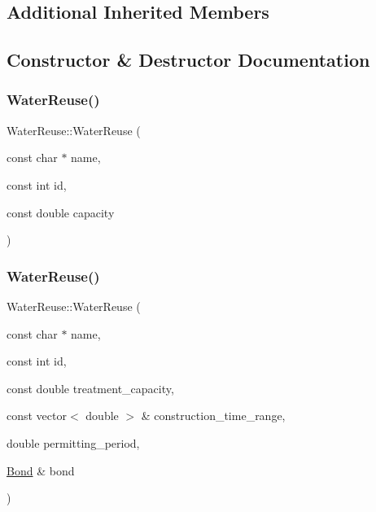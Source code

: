 \subsection*{Additional Inherited Members}


\subsection{Constructor \& Destructor Documentation}
\mbox{\label{classWaterReuse_a0493da65856f50fad2bc2d2c087f378f}} 
\subsubsection{\texorpdfstring{Water\+Reuse()}{WaterReuse()}\hspace{0.1cm}{\footnotesize\ttfamily [1/3]}}
{\footnotesize\ttfamily Water\+Reuse\+::\+Water\+Reuse (\begin{DoxyParamCaption}\item[{const char $\ast$}]{name,  }\item[{const int}]{id,  }\item[{const double}]{capacity }\end{DoxyParamCaption})}

\mbox{\label{classWaterReuse_a107ecd54d6fd705f0c31e57de21914e1}} 
\subsubsection{\texorpdfstring{Water\+Reuse()}{WaterReuse()}\hspace{0.1cm}{\footnotesize\ttfamily [2/3]}}
{\footnotesize\ttfamily Water\+Reuse\+::\+Water\+Reuse (\begin{DoxyParamCaption}\item[{const char $\ast$}]{name,  }\item[{const int}]{id,  }\item[{const double}]{treatment\+\_\+capacity,  }\item[{const vector$<$ double $>$ \&}]{construction\+\_\+time\+\_\+range,  }\item[{double}]{permitting\+\_\+period,  }\item[{\mbox{\hyperlink{classBond}{Bond}} \&}]{bond }\end{DoxyParamCaption})}

